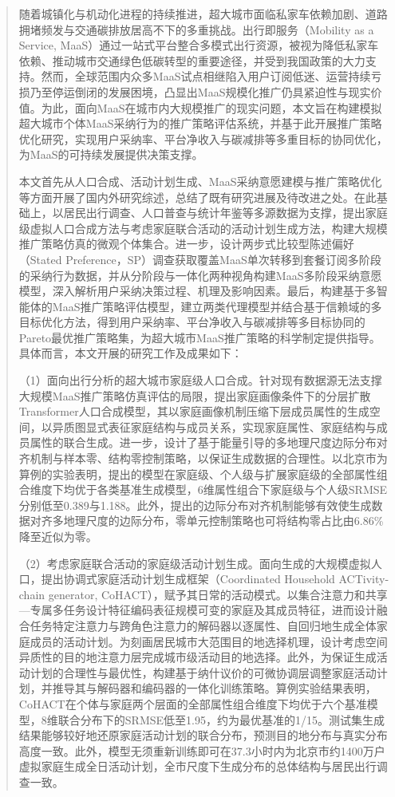 \setlength{\baselineskip}{20pt}
\begin{abstract}

随着城镇化与机动化进程的持续推进，超大城市面临私家车依赖加剧、道路拥堵频发与交通碳排放居高不下的多重挑战。出行即服务（Mobility as a Service, MaaS）通过一站式平台整合多模式出行资源，被视为降低私家车依赖、推动城市交通绿色低碳转型的重要途径，并受到我国政策的大力支持。然而，全球范围内众多MaaS试点相继陷入用户订阅低迷、运营持续亏损乃至停运倒闭的发展困境，凸显出MaaS规模化推广仍具紧迫性与现实价值。为此，面向MaaS在城市内大规模推广的现实问题，本文旨在构建模拟超大城市个体MaaS采纳行为的推广策略评估系统，并基于此开展推广策略优化研究，实现用户采纳率、平台净收入与碳减排等多重目标的协同优化，为MaaS的可持续发展提供决策支撑。

本文首先从人口合成、活动计划生成、MaaS采纳意愿建模与推广策略优化等方面开展了国内外研究综述，总结了既有研究进展及待改进之处。在此基础上，以居民出行调查、人口普查与统计年鉴等多源数据为支撑，提出家庭级虚拟人口合成方法与考虑家庭联合活动的活动计划生成方法，构建大规模推广策略仿真的微观个体集合。进一步，设计两步式比较型陈述偏好（Stated Preference，SP）调查获取覆盖MaaS单次转移到套餐订阅多阶段的采纳行为数据，并从分阶段与一体化两种视角构建MaaS多阶段采纳意愿模型，深入解析用户采纳决策过程、机理及影响因素。最后，构建基于多智能体的MaaS推广策略评估模型，建立两类代理模型并结合基于信赖域的多目标优化方法，得到用户采纳率、平台净收入与碳减排等多目标协同的Pareto最优推广策略集，为超大城市MaaS推广策略的科学制定提供指导。具体而言，本文开展的研究工作及成果如下：

（1）面向出行分析的超大城市家庭级人口合成。针对现有数据源无法支撑大规模MaaS推广策略仿真评估的局限，提出家庭画像条件下的分层扩散Transformer人口合成模型，其以家庭画像机制压缩下层成员属性的生成空间，以异质图显式表征家庭结构与成员关系，实现家庭属性、家庭结构与成员属性的联合生成。进一步，设计了基于能量引导的多地理尺度边际分布对齐机制与样本零、结构零控制策略，以保证生成数据的合理性。以北京市为算例的实验表明，提出的模型在家庭级、个人级与扩展家庭级的全部属性组合维度下均优于各类基准生成模型，6维属性组合下家庭级与个人级SRMSE分别低至0.389与1.188。此外，提出的边际分布对齐机制能够有效使生成数据对齐多地理尺度的边际分布，零单元控制策略也可将结构零占比由6.86\%降至近似为零。

（2）考虑家庭联合活动的家庭级活动计划生成。面向生成的大规模虚拟人口，提出协调式家庭活动计划生成框架（Coordinated Household ACTivity-chain generator, CoHACT），赋予其日常的活动模式。以集合注意力和共享—专属多任务设计特征编码表征规模可变的家庭及其成员特征，进而设计融合任务特定注意力与跨角色注意力的解码器以逐属性、自回归地生成全体家庭成员的活动计划。为刻画居民城市大范围目的地选择机理，设计考虑空间异质性的目的地注意力层完成城市级活动目的地选择。此外，为保证生成活动计划的合理性与最优性，构建基于纳什议价的可微协调层调整家庭活动计划，并推导其与解码器和编码器的一体化训练策略。算例实验结果表明，CoHACT在个体与家庭两个层面的全部属性组合维度下均优于六个基准模型，8维联合分布下的SRMSE低至1.95，约为最优基准的1/15。测试集生成结果能够较好地还原家庭活动计划的联合分布，预测目的地分布与真实分布高度一致。此外，模型无须重新训练即可在37.3小时内为北京市约1400万户虚拟家庭生成全日活动计划，全市尺度下生成分布的总体结构与居民出行调查一致。


\end{abstract}
